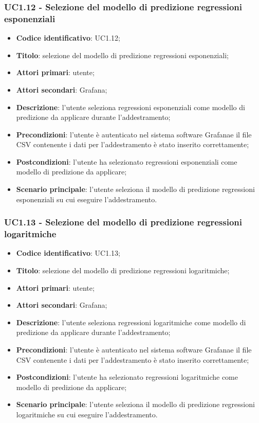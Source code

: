 \subsubsection{UC1.12 - Selezione del modello di predizione regressioni esponenziali}
\begin{itemize}
	\item \textbf{Codice identificativo}: UC1.12;
	\item \textbf{Titolo}: selezione del modello di predizione regressioni esponenziali;
	\item \textbf{Attori primari}: utente;
	\item \textbf{Attori secondari}: Grafana\glo;
	\item \textbf{Descrizione}: l'utente seleziona regressioni esponenziali come modello di predizione da applicare durante l'addestramento;
	\item \textbf{Precondizioni}: l'utente è autenticato nel sistema software Grafana\glosp e il file CSV contenente i dati per l'addestramento è stato inserito correttamente;
	\item \textbf{Postcondizioni}: l'utente ha selezionato regressioni esponenziali come modello di predizione da applicare;
	\item \textbf{Scenario principale}: l'utente seleziona il modello di predizione regressioni esponenziali su cui eseguire l'addestramento.
\end{itemize}
\subsubsection{UC1.13 - Selezione del modello di predizione regressioni logaritmiche}
\begin{itemize}
	\item \textbf{Codice identificativo}: UC1.13;
	\item \textbf{Titolo}: selezione del modello di predizione regressioni logaritmiche;
	\item \textbf{Attori primari}: utente;
	\item \textbf{Attori secondari}: Grafana\glo;
	\item \textbf{Descrizione}: l'utente seleziona regressioni logaritmiche come modello di predizione da applicare durante l'addestramento;
	\item \textbf{Precondizioni}: l'utente è autenticato nel sistema software Grafana\glosp e il file CSV contenente i dati per l'addestramento è stato inserito correttamente;
	\item \textbf{Postcondizioni}: l'utente ha selezionato regressioni logaritmiche come modello di predizione da applicare;
	\item \textbf{Scenario principale}: l'utente seleziona il modello di predizione regressioni logaritmiche su cui eseguire l'addestramento.
\end{itemize}
